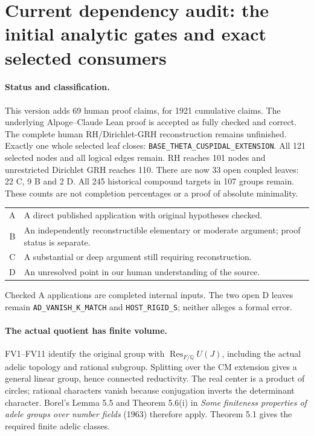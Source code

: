 \section{Current dependency audit: the initial analytic gates and exact selected consumers}
\label{sec:dependency-audit-v38}

\paragraph{Status and classification.}
This version adds 69 human proof claims, for 1921 cumulative claims. The underlying Alpoge–Claude Lean proof is accepted as fully checked and correct. The complete human RH/\allowbreak{}Dirichlet-GRH reconstruction remains unfinished.
Exactly one whole selected leaf closes:
\texttt{BASE\_THETA\_CUSPIDAL\_EXTENSION}. All 121 selected
nodes and all logical edges remain. RH reaches 101 nodes and
unrestricted Dirichlet GRH reaches 110. There are now 33 open
coupled leaves: 22 C, 9 B and 2 D. All 245 historical compound
targets in 107 groups remain. These counts are not completion
percentages or a proof of absolute minimality.

\begin{center}\small
\begin{tabular}{cp{}}
A & A direct published application with original hypotheses checked.\\
B & An independently reconstructible elementary or moderate argument; proof status is separate.\\
C & A substantial or deep argument still requiring reconstruction.\\
D & An unresolved point in our human understanding of the source.\\
\end{tabular}
\end{center}
Checked A applications are completed internal inputs. The two open
D leaves remain \texttt{AD\_VANISH\_K\_MATCH} and
\texttt{HOST\_RIGID\_S}; neither alleges a formal error.

\paragraph{The actual quotient has finite volume.}
FV1--FV11 identify the original group with
$\operatorname{Res}_{F/\mathbb Q}U(J)$, including the actual adelic
topology and rational subgroup. Splitting over the CM extension
gives a general linear group, hence connected reductivity. The
real center is a product of circles; rational characters vanish
because conjugation inverts the determinant character.
Borel's Lemma 5.5 and Theorem 5.6(i) in \emph{Some finiteness
properties of adele groups over number fields} (1963) therefore
apply. Theorem 5.1 gives the required finite adelic classes.

